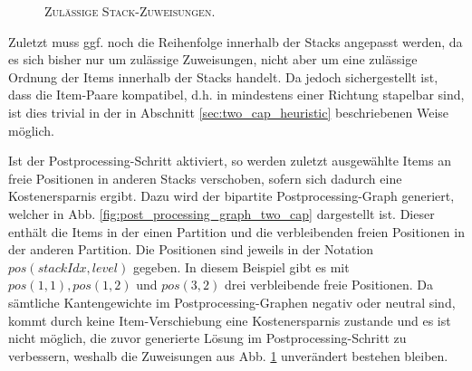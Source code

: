 \begin{figure}[H]
  \centering
    \caption{\textsc{Zulässige Stack-Zuweisungen.}}
    \label{fig:stacking_solution}
\end{figure}

Zuletzt muss ggf. noch die Reihenfolge innerhalb der Stacks angepasst werden, da es sich bisher nur um zulässige Zuweisungen,
nicht aber um eine zulässige Ordnung der Items innerhalb der Stacks handelt.
Da jedoch sichergestellt ist, dass die Item-Paare kompatibel, d.h. in mindestens einer Richtung stapelbar sind,
ist dies trivial in der in Abschnitt \ref{sec:two_cap_heuristic} beschriebenen Weise möglich.

Ist der Postprocessing-Schritt aktiviert, so werden zuletzt ausgewählte Items an freie Positionen in anderen Stacks
verschoben, sofern sich dadurch eine Kostenersparnis ergibt. Dazu wird der bipartite Postprocessing-Graph generiert, welcher in
Abb. \ref{fig:post_processing_graph_two_cap} dargestellt ist. Dieser enthält die Items in der einen Partition
und die verbleibenden freien Positionen in der anderen Partition. Die Positionen sind jeweils in der Notation
$pos(stackIdx, level)$ gegeben.
In diesem Beispiel gibt es mit $pos(1, 1), pos(1, 2)$ und $pos(3, 2)$ drei verbleibende freie Positionen.
Da sämtliche Kantengewichte im Postprocessing-Graphen negativ oder neutral sind, kommt durch keine Item-Verschiebung
eine Kostenersparnis zustande und es ist nicht möglich, die zuvor generierte Lösung im Postprocessing-Schritt zu
verbessern, weshalb die Zuweisungen aus Abb. \ref{fig:stacking_solution} unverändert bestehen bleiben.

